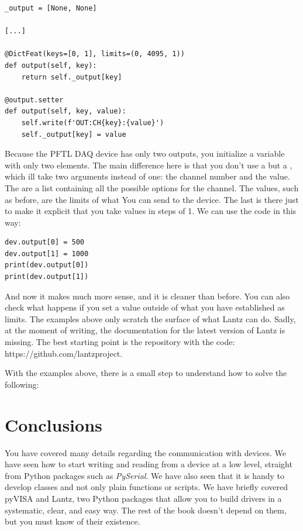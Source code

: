 \begin{verbatim}
_output = [None, None]

[...]

@DictFeat(keys=[0, 1], limits=(0, 4095, 1))
def output(self, key):
    return self._output[key]

@output.setter
def output(self, key, value):
    self.write(f'OUT:CH{key}:{value}')
    self._output[key] = value
\end{verbatim}

Because the {PFTL DAQ} device has only two outputs, you initialize a variable  with only two elements. The main difference here is that you don't use a  but a , which ill take two arguments instead of one: the channel number and the value. The  are a list containing all the possible options for the channel. The values, such as before, are the limits of what You can send to the device. The last  is there just to make it explicit that you take values in steps of 1. We can use the code in this way:

\begin{verbatim}
dev.output[0] = 500
dev.output[1] = 1000
print(dev.output[0])
print(dev.output[1])
\end{verbatim}

And now it makes much more sense, and it is cleaner than before. You can also check what happens if you set a value outside of what you have established as limits. The examples above only scratch the surface of what Lantz can do. Sadly, at the moment of writing, the documentation for the latest version of Lantz is missing. The best starting point is the repository with the code: https://github.com/lantzproject.

With the examples above, there is a small step to understand how to solve the following:


\section{Conclusions}\label{sec:conclusions2}
You have covered many details regarding the communication with devices. We have seen how to start writing and reading from a device at a low level, straight from Python packages such as \emph{PySerial}. We have also seen that it is handy to develop classes and not only plain functions or scripts. We have briefly covered pyVISA and Lantz, two Python packages that allow you to build drivers in a systematic, clear, and easy way. The rest of the book doesn't depend on them, but you must know of their existence.

